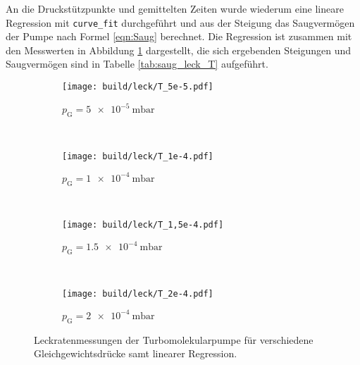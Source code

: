 



\FloatBarrier

An die Druckstützpunkte und gemittelten Zeiten wurde wiederum eine lineare
Regression mit \texttt{curve\_fit} durchgeführt und aus der Steigung das
Saugvermögen der Pumpe nach Formel \eqref{eqn:Saug} berechnet.
Die Regression ist zusammen mit den Messwerten in Abbildung
\ref{fig:leck_T} dargestellt, die sich ergebenden Steigungen und
Saugvermögen sind in Tabelle \ref{tab:saug_leck_T} aufgeführt.

\begin{figure}
  \centering
  \begin{subfigure}[b]{0.48\textwidth}
    \texttt{[image: build/leck/T\_5e-5.pdf]}
    \caption{$p_\text{G} = \SI{5e-5}{\milli\bar}$}
  \end{subfigure}
  ~ %
  \begin{subfigure}[b]{0.48\textwidth}
    \texttt{[image: build/leck/T\_1e-4.pdf]}
    \caption{$p_\text{G} = \SI{1e-4}{\milli\bar}$}
  \end{subfigure}
  \\
  \begin{subfigure}[b]{0.48\textwidth}
    \texttt{[image: build/leck/T\_1,5e-4.pdf]}
    \caption{$p_\text{G} = \SI{1,5e-4}{\milli\bar}$}
  \end{subfigure}
  ~ %
  \begin{subfigure}[b]{0.48\textwidth}
    \texttt{[image: build/leck/T\_2e-4.pdf]}
    \caption{$p_\text{G} = \SI{2e-4}{\milli\bar}$}
  \end{subfigure}
  \caption{Leckratenmessungen der Turbomolekularpumpe für verschiedene Gleichgewichtsdrücke samt linearer Regression.}
  \label{fig:leck_T}
\end{figure}


\FloatBarrier
